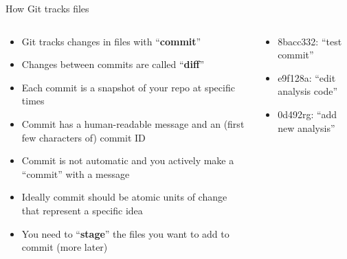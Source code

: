 \documentclass[handout,pdftex,10pt,aspectratio=169]{beamer}
\begin{document}
\begin{frame}{How Git tracks files}
  \begin{columns}[c]
    \begin{column}{0.46\linewidth}
      \begin{itemize}[<+->] \setlength\itemsep{10pt}
        \item Git tracks changes in files with ``\textbf{commit}''
        \item Changes between commits are called ``\textbf{diff}''
        \item Each commit is a snapshot of your repo at specific times
        \item Commit has a human-readable message and an (first few characters of) commit ID
        \item Commit is not automatic and you actively make a ``commit'' with a message
        \item Ideally commit should be atomic units of change that represent a specific idea
        \item You need to ``\textbf{stage}'' the files you want to add to commit (more later)
      \end{itemize}
    \end{column} \hfill
    \begin{column}{0.53\linewidth}
      \centering
      \begin{itemize}
        \item<4-> 8bacc332: ``test commit''
        \item<4-> e9f128a: ``edit analysis code''
        \item<4-> 0d492rg: ``add new analysis''
      \end{itemize}
    \end{column}
  \end{columns}
\end{frame}
\end{document}
